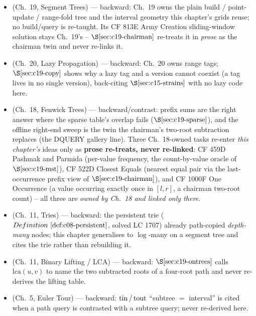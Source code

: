 
\begin{itemize}[nosep, leftmargin=1.4em]
  \item {} (Ch.~19, Segment Trees) --- backward: Ch.~19 owns the plain
        build / point-update / range-fold tree and the interval geometry this chapter's
        grids reuse; no build/query is re-taught. Its CF 813E Army Creation sliding-window
        solution stays Ch.~19's -- \(\secref{c19-chairman}\) re-treats it in \emph{prose} as the
        chairman twin and never re-links it.
  \item {} (Ch.~20, Lazy Propagation) --- backward: Ch.~20 owns range tags;
        \(\secref{c19-copy}\) shows why a lazy tag and a version cannot coexist (a tag lives in
        no single version), back-citing \(\secref{c15-strains}\) with no lazy code here.
  \item {} (Ch.~18, Fenwick Trees) --- backward/contrast: prefix sums are the right
        answer where the sparse table's overlap fails (\(\secref{c19-sparse}\)), and the offline
        right-end sweep is the twin the chairman's two-root subtraction replaces (the DQUERY
        gallery line). Three Ch.~18-owned tasks re-enter \emph{this chapter's} ideas only as
        \textbf{prose re-treats, never re-linked}: CF 459D Pashmak and Parmida (per-value
        frequency, the count-by-value oracle of \(\secref{c19-mst}\)), CF 522D Closest Equals
        (nearest equal pair via the last-occurrence prefix view of \(\secref{c19-chairman}\)),
        and CF 1000F One Occurrence (a value occurring exactly once in \([l,r]\), a chairman
        two-root count) -- all three are \emph{owned by Ch.~18 and linked only there}.
  \item {} (Ch.~11, Tries) --- backward: the persistent trie (\(\defref{c08-persistent}\),
        solved LC 1707) already path-copied \emph{depth-many} nodes; this chapter generalises to
        \(\log\)-many on a segment tree and cites the trie rather than rebuilding it.
  \item {} (Ch.~11, Binary Lifting / LCA) --- backward: \(\secref{c19-ontrees}\) calls
        \(\mathrm{lca}(u,v)\) to name the two subtracted roots of a four-root path and never
        re-derives the lifting table.
  \item {} (Ch.~5, Euler Tour) --- backward: \(\operatorname{tin}/\operatorname{tout}\) ``subtree \(=\) interval'' is
        cited when a path query is contrasted with a subtree query; never re-derived here.

\end{itemize}
